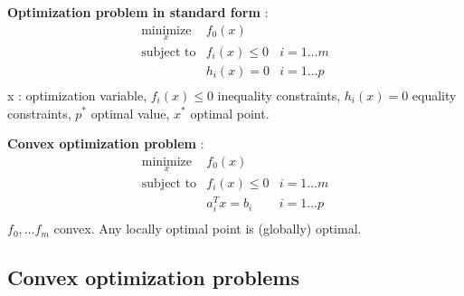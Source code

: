 \documentclass[a4paper, 10pt]{article}
\newcommand{\itm}[1]{{\color{itmcolor} \textbf{#1}}}
\begin{document}
\begin{multicols}{2}
\itm{Optimization problem in standard form} :
\begin{displaymath}
  \begin{array}{lll}
    \underset{x}{\text{minimize}} & f_0(x) &\\
    \text{subject to} & f_i(x) \le 0 & i = 1 \dots m\\
                                  & h_i(x) = 0 & i = 1 \dots p\\
  \end{array}
\end{displaymath}
x : optimization variable, $f_i(x) \le 0$ inequality constraints,
$h_i(x) = 0$ equality constraints, $p^*$ optimal value, $x^*$ optimal
point.

\itm{Convex optimization problem} :
\begin{displaymath}
  \begin{array}{lll}
    \underset{x}{\text{minimize}} & f_0(x) &\\
    \text{subject to} & f_i(x) \le 0 & i = 1 \dots m\\
                                  & a_i^Tx = b_i & i = 1 \dots p\\
  \end{array}
\end{displaymath}
$f_0, \dots f_m$ convex. Any locally optimal point is (globally)
optimal.
\end{multicols}

\subsection{Convex optimization problems}
\end{document}
